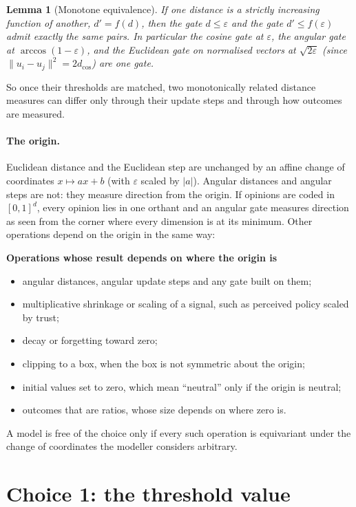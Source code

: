 \documentclass[11pt]{article}
\newtheorem{lemma}{Lemma}
\begin{document}
\begin{lemma}[Monotone equivalence]
\label{lem:monotone}
If one distance is a strictly increasing function of another, $d' = f(d)$, then the gate $d \le \varepsilon$ and the gate $d' \le f(\varepsilon)$ admit exactly the same pairs.
In particular the cosine gate at $\varepsilon$, the angular gate at $\arccos(1-\varepsilon)$, and the Euclidean gate on normalised vectors at $\sqrt{2\varepsilon}$ (since $\lVert u_i - u_j\rVert^2 = 2 d_{\cos}$) are one gate.
\end{lemma}
\noindent So once their thresholds are matched, two monotonically related distance measures can differ only through their update steps and through how outcomes are measured.

\paragraph{The origin.}
Euclidean distance and the Euclidean step are unchanged by an affine change of coordinates $x \mapsto a x + b$ (with $\varepsilon$ scaled by $|a|$).
Angular distances and angular steps are not: they measure direction from the origin.
If opinions are coded in $[0,1]^d$, every opinion lies in one orthant and an angular gate measures direction as seen from the corner where every dimension is at its minimum.
Other operations depend on the origin in the same way:
\begin{framed}
\noindent\textbf{Operations whose result depends on where the origin is}
\begin{itemize}
\item angular distances, angular update steps and any gate built on them;
\item multiplicative shrinkage or scaling of a signal, such as perceived policy scaled by trust;
\item decay or forgetting toward zero;
\item clipping to a box, when the box is not symmetric about the origin;
\item initial values set to zero, which mean ``neutral'' only if the origin is neutral;
\item outcomes that are ratios, whose size depends on where zero is.
\end{itemize}
\end{framed}
\noindent A model is free of the choice only if every such operation is equivariant under the change of coordinates the modeller considers arbitrary.

\section{Choice 1: the threshold value}
\label{sec:threshold}
\end{document}
